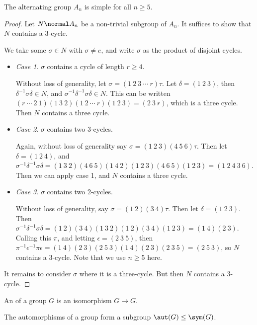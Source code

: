 \begin{theorem}[$A_n$ is Simple]
The alternating group $A_n$ is simple for all $n \geq 5$.
\end{theorem}
\begin{proof}
	Let $N \normal A_n$ be a non-trivial subgroup of $A_n$. It suffices to show that $N$ contains a $3$-cycle.
	
	We take some $\sigma \in N$ with $\sigma \neq e$, and write $\sigma$ as the product of disjoint cycles.

	\begin{itemize}
		\item \emph{Case 1}. $\sigma$ contains a cycle of length $r \geq 4$.
	
		Without loss of generality, let $\sigma = (1\ 2\ 3\ \cdots\ r)\tau$. Let $\delta = (1\ 2\ 3)$, then $\delta^{-1} \sigma \delta \in N$, and $\sigma^{-1}\delta^{-1} \sigma \delta \in N$. This can be written $(r\ \cdots\ 2\ 1)(1\ 3\ 2)(1\ 2\ \cdots\ r)(1\ 2\ 3) = (2\ 3\ r)$, which is a three cycle. Then $N$ contains a three cycle.

		\item \emph{Case 2}. $\sigma$ contains two 3-cycles.
		
		Again, without loss of generality say $\sigma = (1\ 2\ 3)(4\ 5\ 6)\tau$. Then let $\delta = (1\ 2\ 4)$, and $\sigma^{-1}\delta^{-1}\sigma \delta = (1\ 3\ 2)(4\ 6\ 5) (1\ 4\ 2)(1\ 2\ 3)(4\ 6\ 5)(1\ 2\ 3) = (1\ 2\ 4\ 3\ 6)$. Then we can apply case 1, and $N$ contains a three cycle.
		\item \emph{Case 3}. $\sigma$ contains two 2-cycles.
		
		Without loss of generality, say $\sigma = (1\ 2)(3\ 4) \tau$. Then let $\delta = (1\ 2\ 3)$. Then $\sigma^{-1}\delta^{-1} \sigma \delta = (1\ 2)(3\ 4)(1\ 3\ 2)(1\ 2)(3\ 4)(1\ 2\ 3) = (1\ 4)(2\ 3)$. Calling this $\pi$, and letting $\epsilon = (2\ 3\ 5)$, then $\pi^{-1} \epsilon^{-1} \pi \epsilon = (1\ 4)(2\ 3)(2\ 5\ 3)(1\ 4)(2\ 3)(2\ 3\ 5) = (2\ 5\ 3)$, so $N$ contains a $3$-cycle. Note that we use $n \geq 5$ here. 
	\end{itemize}
	It remains to consider $\sigma$ where it is a three-cycle. But then $N$ contains a 3-cycle.
\end{proof}

\begin{definition}[Automorphism]
	An  of a group $G$ is an isomorphism $G \rightarrow G$.
\end{definition}

The automorphisms of a group form a subgroup $\aut(G) \leq \sym(G)$.

